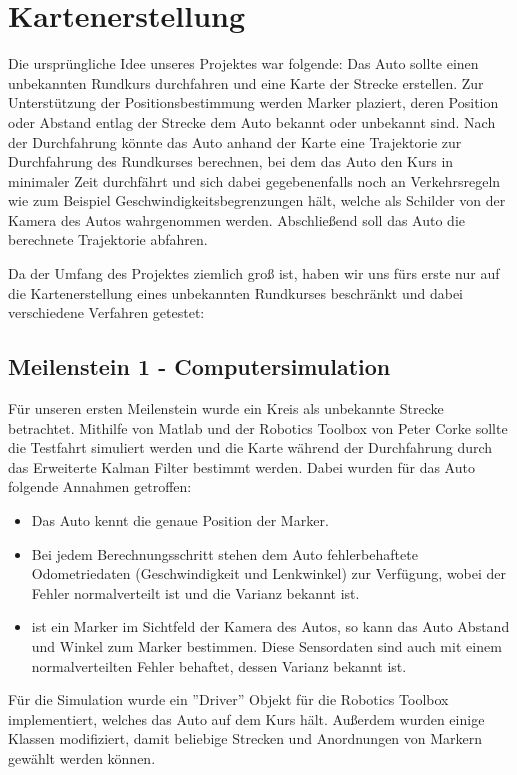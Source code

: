 \section{Kartenerstellung}

Die ursprüngliche Idee unseres Projektes war folgende: Das Auto sollte einen unbekannten Rundkurs durchfahren und eine Karte der Strecke erstellen. Zur Unterstützung der Positionsbestimmung werden Marker plaziert, deren Position oder Abstand entlag der Strecke dem Auto bekannt oder unbekannt sind.
Nach der Durchfahrung könnte das Auto anhand der Karte eine Trajektorie zur Durchfahrung des Rundkurses berechnen, bei dem das Auto den Kurs in minimaler Zeit durchfährt und sich dabei gegebenenfalls noch an Verkehrsregeln wie zum Beispiel Geschwindigkeitsbegrenzungen hält, welche als Schilder von der Kamera des Autos wahrgenommen werden.
Abschließend soll das Auto die berechnete Trajektorie abfahren.

Da der Umfang des Projektes ziemlich groß ist, haben wir uns fürs erste nur auf die Kartenerstellung eines unbekannten Rundkurses beschränkt und dabei verschiedene Verfahren getestet:

\subsection{Meilenstein 1 - Computersimulation}

Für unseren ersten Meilenstein wurde ein Kreis als unbekannte Strecke betrachtet. Mithilfe von Matlab und der Robotics Toolbox von Peter Corke sollte die Testfahrt simuliert werden und die Karte während der Durchfahrung durch das Erweiterte Kalman Filter bestimmt werden.
Dabei wurden für das Auto folgende Annahmen getroffen:
\begin{itemize}
 	\item Das Auto kennt die genaue Position der Marker.
 	\item Bei jedem Berechnungsschritt stehen dem Auto fehlerbehaftete Odometriedaten (Geschwindigkeit und Lenkwinkel) zur Verfügung, wobei der Fehler normalverteilt ist und die Varianz bekannt ist.
 	\item ist ein Marker im Sichtfeld der Kamera des Autos, so kann das Auto Abstand und Winkel zum Marker bestimmen. Diese Sensordaten sind auch mit einem normalverteilten Fehler behaftet, dessen Varianz bekannt ist.
\end{itemize}
Für die Simulation wurde ein ''Driver'' Objekt für die Robotics Toolbox implementiert, welches das Auto auf dem Kurs hält. Außerdem wurden einige Klassen modifiziert, damit beliebige Strecken und Anordnungen von Markern gewählt werden können.

